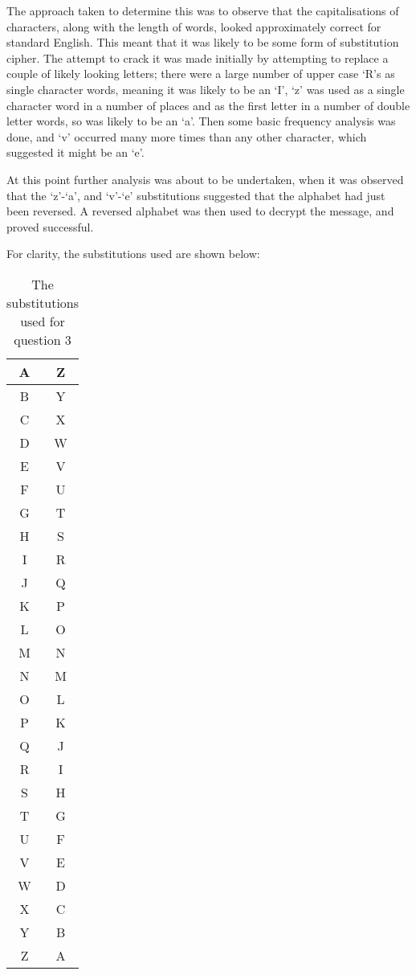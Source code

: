 The approach taken to determine this was to observe that the capitalisations of characters, along with the length of words, looked approximately correct for standard English.
This meant that it was likely to be some form of substitution cipher.
The attempt to crack it was made initially by attempting to replace a couple of likely looking letters; there were a large number of upper case `R's as single character words, meaning it was likely to be an `I', `z' was used as a single character word in a number of places and as the first letter in a number of double letter words, so was likely to be an `a'.
Then some basic frequency analysis was done, and `v' occurred many more times than any other character, which suggested it might be an `e'.

At this point further analysis was about to be undertaken, when it was observed that the `z'-`a', and `v'-`e' substitutions suggested that the alphabet had just been reversed.
A reversed alphabet was then used to decrypt the message, and proved successful.

For clarity, the substitutions used are shown below:

\begin{table}[h]
	\centering
	\begin{tabular}[h]{| c | c |}
		\hline
		A	& Z	\\ \hline
		B	& Y	\\ \hline
		C	& X	\\ \hline
		D	& W	\\ \hline
		E	& V	\\ \hline
		F	& U	\\ \hline
		G	& T	\\ \hline
		H	& S	\\ \hline
		I	& R	\\ \hline
		J	& Q	\\ \hline
		K	& P	\\ \hline
		L	& O	\\ \hline
		M	& N	\\ \hline
		N	& M	\\ \hline
		O	& L	\\ \hline
		P	& K	\\ \hline
		Q	& J	\\ \hline
		R	& I	\\ \hline
		S	& H	\\ \hline
		T	& G	\\ \hline
		U	& F	\\ \hline
		V	& E	\\ \hline
		W	& D	\\ \hline
		X	& C	\\ \hline
		Y	& B	\\ \hline
		Z	& A	\\ \hline
	\end{tabular}
	\caption{The substitutions used for question 3}
	\label{tab:sub3}
\end{table}
